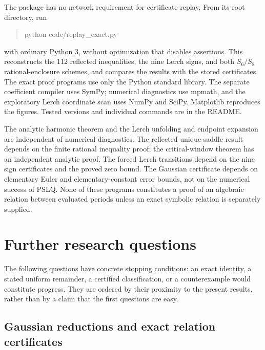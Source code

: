 \documentclass[11pt,letterpaper]{article}
\numberwithin{equation}{section}
\theoremstyle{plain}
\theoremstyle{definition}
\theoremstyle{remark}
\begin{document}
The package has no network requirement for certificate replay.
From its root directory, run
\begin{quote}\ttfamily
python code/replay\_exact.py
\end{quote}
with ordinary Python 3, without optimization that disables assertions.
This reconstructs the 112 reflected inequalities, the nine Lerch
signs, and both $S_6/S_8$ rational-enclosure schemes, and compares the
results with the stored certificates. The exact proof programs use
only the Python standard library. The separate coefficient compiler
uses SymPy; numerical diagnostics use mpmath, and the exploratory
Lerch coordinate scan uses NumPy and SciPy. Matplotlib reproduces the
figures. Tested versions and individual commands are in the README.

The analytic harmonic theorem and the Lerch unfolding and endpoint
expansion are independent of numerical diagnostics.
The reflected unique-saddle result depends on the finite rational
inequality proof; the critical-window theorem has an independent
analytic proof. The forced Lerch transitions depend on the nine sign
certificates and the proved zero bound. The Gaussian certificate
depends on elementary Euler and elementary-constant error bounds,
not on the numerical success of PSLQ. None of these programs
constitutes a proof of an algebraic relation between evaluated
periods unless an exact symbolic relation is separately supplied.




\section{Further research questions}
\label{cont26:sec:further}

The following questions have concrete stopping conditions: an exact
identity, a stated uniform remainder, a certified classification, or
a counterexample would constitute progress. They are ordered by
their proximity to the present results, rather than by a claim that
the first questions are easy.

\subsection{Gaussian reductions and exact relation certificates}
\end{document}
